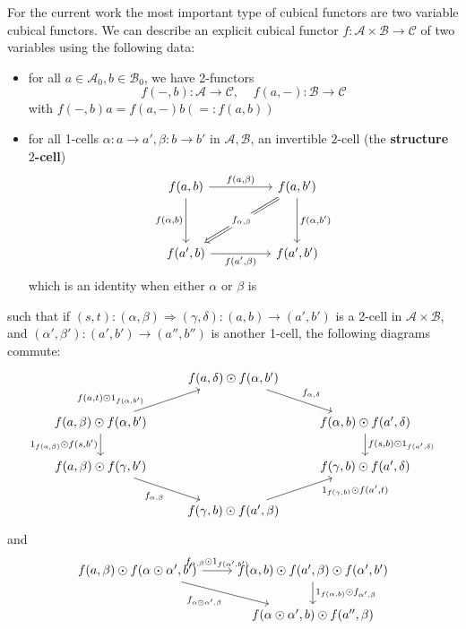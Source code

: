 For the current work the most important type of cubical functors are two variable cubical functors. We can describe an explicit cubical functor $f:\mathcal{A}\times \mathcal{B}\rightarrow \mathcal{C}$ of two variables using the following data:
\begin{itemize}
    \item for all $a \in \mathcal{A}_0, b \in \mathcal{B}_0$, we have 2-functors
    \begin{equation*}
        f(-,b):\mathcal{A}\rightarrow \mathcal{C},\;\;\;\;f(a,-):\mathcal{B}\rightarrow \mathcal{C}
    \end{equation*}
    with $f(-,b)a = f(a,-)b (=: f(a,b))$
    \item for all 1-cells $\alpha:a\rightarrow a',\beta:b\rightarrow b'$ in $\mathcal{A},\mathcal{B}$, an invertible $2$-cell (the \textbf{structure $2$-cell})
    \[\begin{tikzcd}
    	{f(a,b)} && {f(a,b')} \\
    	\\
    	{f(a',b)} && {f(a',b')}
    	\arrow["{f(a,\beta)}", from=1-1, to=1-3]
    	\arrow["{f(\alpha,b')}", from=1-3, to=3-3]
    	\arrow["{f(a',\beta)}"', from=3-1, to=3-3]
    	\arrow["{f(\alpha,b)}"', from=1-1, to=3-1]
    	\arrow["{f_{\alpha,\beta}}"{description}, Rightarrow, from=1-3, to=3-1]
    \end{tikzcd}\]
    which is an identity when either $\alpha$ or $\beta$ is
\end{itemize}
such that if $(s,t):(\alpha,\beta)\Rightarrow(\gamma,\delta):(a,b)\rightarrow (a',b')$ is a 2-cell in $\mathcal{A}\times \mathcal{B}$, and $(\alpha',\beta'):(a',b')\rightarrow (a'',b'')$ is another 1-cell, the following diagrams commute:
\[\begin{tikzcd}
	& {f(a,\delta)\odot f(\alpha,b')} \\
	{f(a,\beta)\odot f(\alpha,b')} && {f(\alpha,b)\odot f(a',\delta)} \\
	{f(a,\beta)\odot f(\gamma,b')} && {f(\gamma,b)\odot f(a',\delta)} \\
	& {f(\gamma,b)\odot f(a',\beta)}
	\arrow["{f(a,t)\odot1_{f(\alpha,b')}}"{pos=0.2}, from=2-1, to=1-2]
	\arrow["{f_{\alpha,\delta}}", from=1-2, to=2-3]
	\arrow["{f(s,b)\odot 1_{f(a',\delta)}}", from=2-3, to=3-3]
	\arrow["{1_{f(a,\beta)}\odot f(s,b')}"', from=2-1, to=3-1]
	\arrow["{f_{\alpha,\beta}}"', from=3-1, to=4-2]
	\arrow["{1_{f(\gamma,b)}\odot f(a',t)}"'{pos=0.8}, from=4-2, to=3-3]
\end{tikzcd}\]
and
\[\begin{tikzcd}
	{f(a,\beta)\odot f(\alpha\odot \alpha',b')} & {f(\alpha,b)\odot f(a',\beta)\odot f(\alpha',b')} \\
	& {f(\alpha\odot \alpha',b)\odot f(a'',\beta)}
	\arrow["{f_{\alpha,\beta}\odot1_{f(\alpha',b')}}", from=1-1, to=1-2]
	\arrow["{1_{f(\alpha,b)}\odot f_{\alpha',\beta}}", from=1-2, to=2-2]
	\arrow["{f_{\alpha\odot\alpha',\beta}}"', from=1-1, to=2-2]
\end{tikzcd}\]

